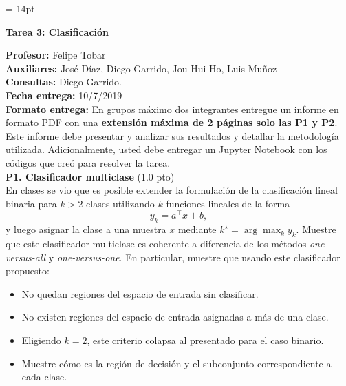 \documentclass[11pt,letterpaper]{article}
\begin{document}
\pagestyle{fancy}
\fancyhf{}

\headheight = 14pt
\begin{center}
\large {\textbf{Tarea 3: Clasificación}}\\
\end{center}
\textbf{Profesor:} Felipe Tobar\\ 
\textbf{Auxiliares:} José Díaz, Diego Garrido, Jou-Hui Ho, Luis Muñoz \\
\textbf{Consultas:} Diego Garrido.\\
\textbf{Fecha entrega:} 10/7/2019 \\
\textbf{Formato entrega:} En grupos máximo dos integrantes entregue un informe en formato PDF con una \textbf{extensión máxima de 2 páginas solo las P1 y P2}. Este informe debe presentar y analizar sus resultados y detallar la metodología utilizada. Adicionalmente, usted debe entregar un Jupyter Notebook con los códigos que creó para resolver la tarea.\\


\noindent\textbf{P1. Clasificador multiclase} (1.0 pto)\\ 
En clases se vio que es posible extender la formulación de la clasificación lineal binaria para $k>2$ clases utilizando $k$ funciones lineales de la forma
\begin{equation*}
    y_k = a^\top x + b,
\end{equation*}
y luego asignar la clase a una muestra $x$ mediante $k^\star =\arg\max_k y_k$. 
Muestre que este clasificador multiclase es coherente a diferencia de los métodos \emph{one-versus-all} y \emph{one-versus-one}. En particular, muestre que usando este clasificador propuesto:
\begin{itemize}
    \item No quedan regiones del espacio de entrada sin clasificar.
    \item No existen regiones del espacio de entrada asignadas a más de una clase.
    \item Eligiendo $k=2$, este criterio colapsa al presentado para el caso binario.
    \item Muestre cómo es la región de decisión y el subconjunto correspondiente a cada clase.
\end{itemize}
\end{document}
